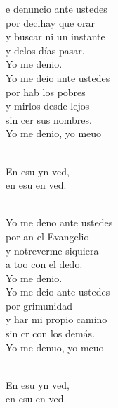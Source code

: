 \documentclass[12pt]{article}
\begin{document}
\begin{multicols*}{2}
\begin{cancion}%
	e denuncio ante ustedes \\
	por decihay que orar \\
	y  buscar ni un instante \\
	y delos días pasar. \\
	Yo me denio. \\
\jump
	Yo me deio ante ustedes \\
	por hab los pobres \\
	y mirlos desde lejos \\
	sin cer sus nombres. \\
	Yo me denio, yo meuo\\\jump\\
	\begin{chorus}%
	En esu yn ved, \\
	en esu en ved.\\
	\end{chorus}%
	\jump\\
	Yo me deno ante ustedes \\
	por an el Evangelio \\
	y notreverme siquiera \\
	a too con el dedo. \\
	Yo me denio. \\
\jump
	Yo me deio ante ustedes \\
	por grimunidad \\
	y har mi propio camino \\
	sin cr con los demás. \\
	Yo me denuo, yo meuo\\\jump\\
	\begin{chorus}%
	En esu yn ved, \\
	en esu en ved.\\

\end{chorus}
\end{cancion}
\end{multicols*}
\end{document}
